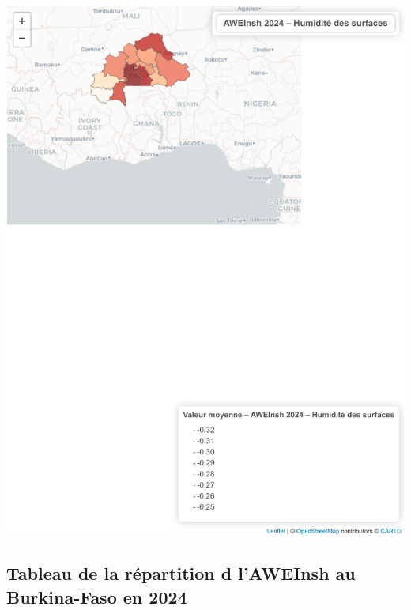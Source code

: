 \documentclass[
]{book}
\begin{document}
\includegraphics{Atlas-Spectral-Sahel_files/figure-latex/eau-aweinsh-1.pdf}

\subsection{Tableau de la répartition d l'AWEInsh au Burkina-Faso en 2024}\label{tableau-de-la-ruxe9partition-d-laweinsh-au-burkina-faso-en-2024}
\end{document}
